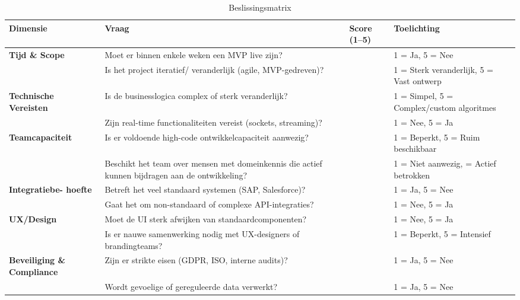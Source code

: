 \begin{table}[H]
    \centering
    \begin{tabular}{|p{3cm}|p{5cm}|p{2cm}|p{4cm}|}
        \hline
        \textbf{Dimensie} & \textbf{Vraag} & \textbf{Score (1–5)} & \textbf{Toelichting} \\
        \hline
        \textbf{Tijd \& Scope} & Moet er binnen enkele \newline weken een MVP live zijn? & & 1 = Ja, 5 = Nee \\
        \cline{2-4}
         & Is het project iteratief/ veranderlijk (agile, MVP-gedreven)? & & 1 = Sterk veranderlijk, 5 = Vast ontwerp \\
        \hline
        \textbf{Technische \newline Vereisten} & Is de businesslogica \newline complex of sterk veranderlijk? & & 1 = Simpel, 5 = \newline Complex/custom \newline algoritmes \\
        \cline{2-4}
         & Zijn real-time functionaliteiten vereist (sockets, streaming)? & & 1 = Nee, 5 = Ja \\
        \hline
        \textbf{Teamcapaciteit} & Is er voldoende high-code ontwikkelcapaciteit aanwezig? & & 1 = Beperkt, 5 = Ruim beschikbaar \\
        \cline{2-4}
         & Beschikt het team over mensen met domeinkennis die actief kunnen bijdragen aan de ontwikkeling? & &1 = Niet aanwezig, \newline 5 = Actief betrokken \\
        \hline
        \textbf{Integratiebe- hoefte} & Betreft het veel standaard systemen (SAP, \newline Salesforce)? & & 1 = Ja, 5 = Nee \\
        \cline{2-4}
         & Gaat het om non-standaard of complexe API-integraties? & & 1 = Nee, 5 = Ja \\
        \hline
        \textbf{UX/Design} & Moet de UI sterk afwijken van \newline standaardcomponenten? & & 1 = Nee, 5 = Ja \\
        \cline{2-4}
         & Is er nauwe \newline samenwerking nodig met UX-designers of brandingteams? & & 1 = Beperkt, 5 = \newline Intensief \\
        \hline
        \textbf{Beveiliging \& Compliance} & Zijn er strikte eisen (GDPR, ISO, interne audits)? & & 1 = Ja, 5 = Nee \\
        \cline{2-4}
         & Wordt gevoelige of gereguleerde data verwerkt? & & 1 = Ja, 5 = Nee \\
        \hline
    \end{tabular}
    \caption{Beslissingsmatrix}
    \label{tab:beslissingsmatrix}
\end{table}


